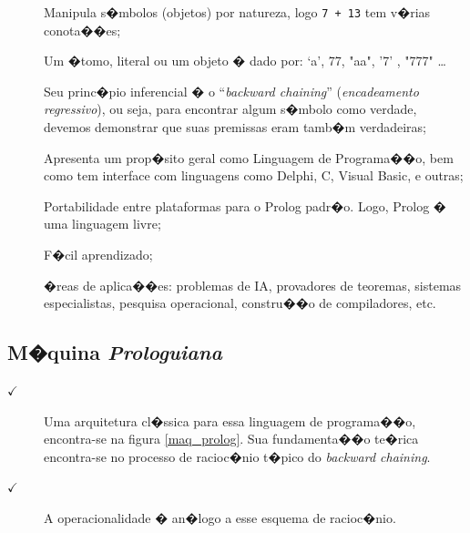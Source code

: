 \documentclass[final,a4paper]{article}
\begin{document}
\begin{description}
 \item [] Manipula s�mbolos (objetos) por natureza,
logo {\tt 7 + 13} tem v�rias
conota��es;

 \item []  Um �tomo, literal ou um objeto � dado por: `a',  77, "aa", '7' ,
"777"     \ldots

 \item []  Seu princ�pio inferencial � o ``{\em backward
chaining}'' ({\em encadeamento regressivo}), ou seja,
 para encontrar algum s�mbolo como verdade,
devemos demonstrar que suas premissas eram
tamb�m verdadeiras;

\item [] Apresenta um prop�sito geral como
Linguagem de Programa��o, bem como tem interface com
linguagens como  Delphi,  C,  Visual Basic, e outras;

\item [] Portabilidade entre plataformas para o Prolog padr�o.
Logo,  Prolog � uma linguagem livre;

\item [] F�cil aprendizado;

\item [] �reas de aplica��es: problemas de IA,
provadores de teoremas, sistemas especialistas,
pesquisa operacional,  constru��o de compiladores, etc.


\end{description}
 
\newpage
\subsection{M�quina {\em Prologuiana}}

\begin{description}

\item [$\checkmark $] Uma arquitetura cl�ssica para essa linguagem de
programa��o, encontra-se na figura
\ref{maq_prolog}. Sua fundamenta��o te�rica
encontra-se no processo de racioc�nio t�pico do
{\em backward chaining}. 

\item [$\checkmark $]  A operacionalidade �
an�logo a esse esquema de racioc�nio.
\end{description}
\end{document}
